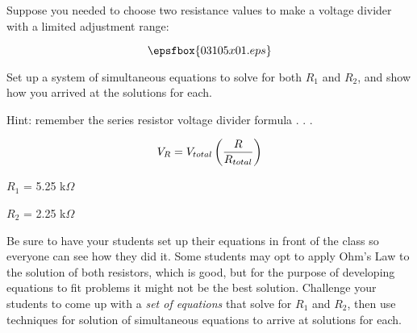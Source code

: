 

Suppose you needed to choose two resistance values to make a voltage divider with a limited adjustment range: 

$$\epsfbox{03105x01.eps}$$

Set up a system of simultaneous equations to solve for both $R_1$ and $R_2$, and show how you arrived at the solutions for each.

\vskip 10pt

Hint: remember the series resistor voltage divider formula . . .

$$V_R = V_{total}\left( {R \over R_{total}} \right)$$







$R_1$ = 5.25 k$\Omega$

\vskip 10pt

$R_2$ = 2.25 k$\Omega$







Be sure to have your students set up their equations in front of the class so everyone can see how they did it.  Some students may opt to apply Ohm's Law to the solution of both resistors, which is good, but for the purpose of developing equations to fit problems it might not be the best solution.  Challenge your students to come up with a {\it set of equations} that solve for $R_1$ and $R_2$, then use techniques for solution of simultaneous equations to arrive at solutions for each.




